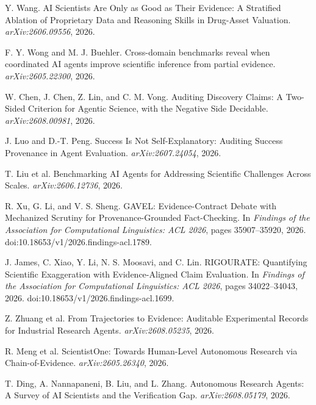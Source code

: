 Y. Wang. AI Scientists Are Only as Good as Their Evidence: A Stratified Ablation of Proprietary Data and Reasoning Skills in Drug-Asset Valuation. \emph{arXiv:2606.09556}, 2026.

F. Y. Wong and M. J. Buehler. Cross-domain benchmarks reveal when coordinated AI agents improve scientific inference from partial evidence. \emph{arXiv:2605.22300}, 2026.

W. Chen, J. Chen, Z. Lin, and C. M. Vong. Auditing Discovery Claims: A Two-Sided Criterion for Agentic Science, with the Negative Side Decidable. \emph{arXiv:2608.00981}, 2026.

J. Luo and D.-T. Peng. Success Is Not Self-Explanatory: Auditing Success Provenance in Agent Evaluation. \emph{arXiv:2607.24054}, 2026.

T. Liu et al. Benchmarking AI Agents for Addressing Scientific Challenges Across Scales. \emph{arXiv:2606.12736}, 2026.

R. Xu, G. Li, and V. S. Sheng. GAVEL: Evidence-Contract Debate with Mechanized Scrutiny for Provenance-Grounded Fact-Checking. In \emph{Findings of the Association for Computational Linguistics: ACL 2026}, pages 35907--35920, 2026. doi:10.18653/v1/2026.findings-acl.1789.

J. James, C. Xiao, Y. Li, N. S. Moosavi, and C. Lin. RIGOURATE: Quantifying Scientific Exaggeration with Evidence-Aligned Claim Evaluation. In \emph{Findings of the Association for Computational Linguistics: ACL 2026}, pages 34022--34043, 2026. doi:10.18653/v1/2026.findings-acl.1699.

Z. Zhuang et al. From Trajectories to Evidence: Auditable Experimental Records for Industrial Research Agents. \emph{arXiv:2608.05235}, 2026.

R. Meng et al. ScientistOne: Towards Human-Level Autonomous Research via Chain-of-Evidence. \emph{arXiv:2605.26340}, 2026.

T. Ding, A. Nannapaneni, B. Liu, and L. Zhang. Autonomous Research Agents: A Survey of AI Scientists and the Verification Gap. \emph{arXiv:2608.05179}, 2026.
